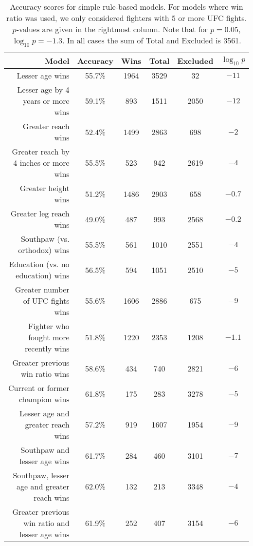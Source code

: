 \begin{center}
\begin{table}[h]
\begin{tabular}{r|ccccc}
  \toprule
  Model & Accuracy & Wins & Total & Excluded & $\log_{10}p$\\
  \hline
  Lesser age wins & 55.7\% & 1964 & 3529 & 32 & $-11$\\
  Lesser age by 4 years or more wins & 59.1\% & 893 & 1511 & 2050 & $-12$\\
  Greater reach wins & 52.4\% & 1499 & 2863 & 698 & $-2$\\
  Greater reach by 4 inches or more wins & 55.5\% & 523 & 942 & 2619 & $-4$\\
  Greater height wins & 51.2\% & 1486 & 2903 & 658 & $-0.7$\\
  Greater leg reach wins & 49.0\% & 487 & 993 & 2568 & $-0.2$\\
  Southpaw (vs. orthodox) wins & 55.5\% & 561 & 1010 & 2551 & $-4$\\
  Education (vs. no education) wins & 56.5\% & 594 & 1051 & 2510 & $-5$\\
  Greater number of UFC fights wins & 55.6\% & 1606 & 2886 & 675 & $-9$\\
  Fighter who fought more recently wins & 51.8\% & 1220 & 2353 & 1208 & $-1.1$\\
  Greater previous win ratio wins & 58.6\% & 434 & 740 & 2821 & $-6$\\
  Current or former champion wins & 61.8\% & 175 & 283 & 3278 & $-5$\\
  \hline
  Lesser age and greater reach wins & 57.2\% & 919 & 1607 & 1954 & $-9$\\
  Southpaw and lesser age wins & 61.7\% & 284 & 460 & 3101 & $-7$\\
  Southpaw, lesser age and greater reach wins & 62.0\% & 132 & 213 & 3348 & $-4$\\
  Greater previous win ratio and lesser age wins & 61.9\% & 252 & 407 & 3154 & $-6$\\
  \bottomrule
\end{tabular}
\caption{Accuracy scores for simple rule-based models. For models where win ratio was used, we only considered
fighters with 5 or more UFC fights. $p$-values are given in the rightmost column. Note that for $p=0.05$, $\log_{10}p = -1.3$. In all
cases the sum of 
Total and Excluded is 3561.}
\label{table_simple_rules}
\end{table}
\end{center}

